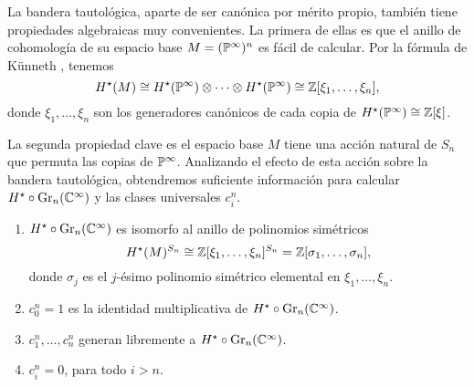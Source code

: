 La bandera tautológica, aparte de ser canónica por mérito propio, también tiene propiedades algebraicas muy convenientes. La primera de ellas es que el anillo de cohomología de su espacio base $M = (\P^\infty)^n$ es fácil de calcular. Por la fórmula de Künneth \cite[p. 216]{hatcher1}, tenemos
$$
H^\star(M)
    \cong H^\star(\P^\infty) \otimes \dots \otimes H^\star(\P^\infty)
    \cong \Z[\xi_1, \dots, \xi_n],
$$
donde $\xi_1, \dots, \xi_n$ son los generadores canónicos de cada copia de $H^\star(\P^\infty) \cong \Z[\xi]$.

La segunda propiedad clave es el espacio base $M$ tiene una acción natural de $S_n$ que permuta las copias de $\P^\infty$. Analizando el efecto de esta acción sobre la bandera tautológica, obtendremos suficiente información para calcular $H^\star \circ \Gr_n(\C^\infty)$ y las clases universales $c_i^n$.

\begin{theorem}
\leavevmode
\begin{enumerate}[label=\alph*)]
    \itemsep 0em
    \item $H^\star \circ \Gr_n(\C^\infty)$ es isomorfo al anillo de polinomios simétricos
    $$H^\star(M)^{S_n} \cong \Z[\xi_1, \dots, \xi_n]^{S_n} = \Z[\sigma_1, \dots, \sigma_n],$$
    donde $\sigma_j$ es el $j$-ésimo polinomio simétrico elemental en $\xi_1, \dots, \xi_n$.
    
    \item $c_0^n = 1$ es la identidad multiplicativa de $H^\star \circ \Gr_n(\C^\infty)$.
    \item $c_1^n, \dots, c_n^n$ generan libremente a $H^\star \circ \Gr_n(\C^\infty)$.
    \item $c_i^n = 0$, para todo $i > n$.
\end{enumerate}
\end{theorem}

